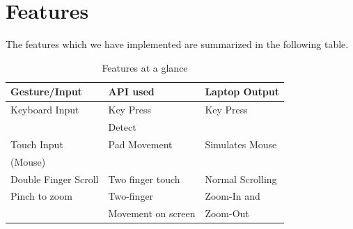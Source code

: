 \documentclass[10pt,conference,letterpaper]{IEEEtran}
\begin{document}
\section{Features}
The features which we have implemented are summarized in the following table.
\begin{table}[!h]
\centering

    \caption{Features at a glance}     %
    \label{tab:font-sizes}

    \begin{small}
    \begin{tabular}{|l|l|l|}
    \hline
    \cline{2-3}
    {\bfseries  Gesture/Input}         & {\bfseries API used}     & {\bfseries Laptop Output}           \\
	\hline
    Keyboard Input	&	Key Press  	& Key Press     \\
    &  Detect&\\
    \hline
    Touch Input 	&	Pad Movement 	& Simulates Mouse     \\
    (Mouse) &  &\\   
    \hline
    Double Finger Scroll	&	Two finger touch	& Normal Scrolling	\\
          
    \hline
    Pinch to zoom	& Two-finger  & Zoom-In and 	\\
                   &  Movement on screen            & Zoom-Out \\
             

\end{tabular}
\end{small}
\end{table}
\end{document}

